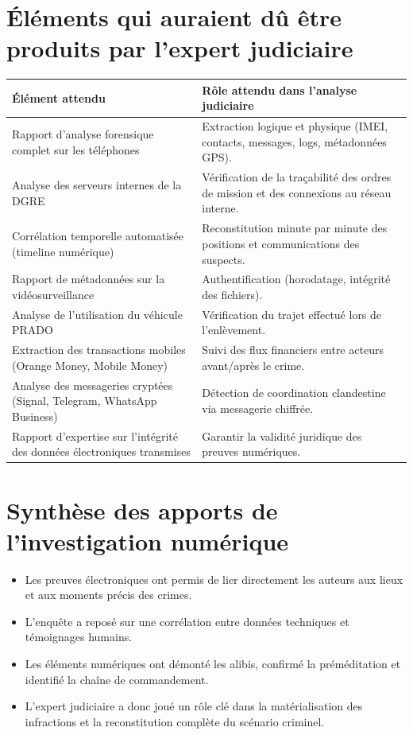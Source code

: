 \documentclass[12pt,a4paper]{article}
\begin{document}
\section{Éléments qui auraient dû être produits par l’expert judiciaire}
\begin{tabular}{|p{6cm}|p{8cm}|}
\hline
\textbf{Élément attendu} & \textbf{Rôle attendu dans l’analyse judiciaire} \\ \hline
Rapport d’analyse forensique complet sur les téléphones & Extraction logique et physique (IMEI, contacts, messages, logs, métadonnées GPS). \\ \hline
Analyse des serveurs internes de la DGRE & Vérification de la traçabilité des ordres de mission et des connexions au réseau interne. \\ \hline
Corrélation temporelle automatisée (timeline numérique) & Reconstitution minute par minute des positions et communications des suspects. \\ \hline
Rapport de métadonnées sur la vidéosurveillance & Authentification (horodatage, intégrité des fichiers). \\ \hline
Analyse de l’utilisation du véhicule PRADO & Vérification du trajet effectué lors de l’enlèvement. \\ \hline
Extraction des transactions mobiles (Orange Money, Mobile Money) & Suivi des flux financiers entre acteurs avant/après le crime. \\ \hline
Analyse des messageries cryptées (Signal, Telegram, WhatsApp Business) & Détection de coordination clandestine via messagerie chiffrée. \\ \hline
Rapport d’expertise sur l’intégrité des données électroniques transmises & Garantir la validité juridique des preuves numériques. \\ \hline
\end{tabular}

\section{Synthèse des apports de l’investigation numérique}
\begin{itemize}[leftmargin=2em]
\item Les preuves électroniques ont permis de lier directement les auteurs aux lieux et aux moments précis des crimes.
\item L’enquête a reposé sur une corrélation entre données techniques et témoignages humains.
\item Les éléments numériques ont démonté les alibis, confirmé la préméditation et identifié la chaîne de commandement.
\item L’expert judiciaire a donc joué un rôle clé dans la matérialisation des infractions et la reconstitution complète du scénario criminel.
\end{itemize}
\end{document}

